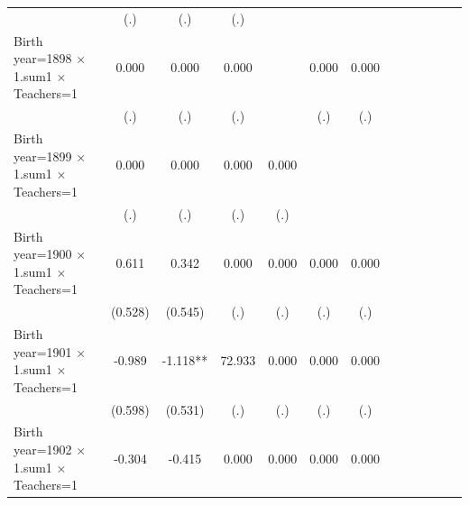 {\begin{tabular}{l*{12}{c}}
                    &         (.)   &         (.)   &         (.)   &               &               &               &               &               &               &               &               &               \\
Birth year=1898 $\times$ 1.sum1 $\times$ Teachers=1&       0.000   &       0.000   &       0.000   &               &       0.000   &       0.000   &               &               &               &               &               &               \\
                    &         (.)   &         (.)   &         (.)   &               &         (.)   &         (.)   &               &               &               &               &               &               \\
Birth year=1899 $\times$ 1.sum1 $\times$ Teachers=1&       0.000   &       0.000   &       0.000   &       0.000   &               &               &               &               &               &               &               &               \\
                    &         (.)   &         (.)   &         (.)   &         (.)   &               &               &               &               &               &               &               &               \\
Birth year=1900 $\times$ 1.sum1 $\times$ Teachers=1&       0.611   &       0.342   &       0.000   &       0.000   &       0.000   &       0.000   &               &               &               &               &               &               \\
                    &     (0.528)   &     (0.545)   &         (.)   &         (.)   &         (.)   &         (.)   &               &               &               &               &               &               \\
Birth year=1901 $\times$ 1.sum1 $\times$ Teachers=1&      -0.989   &      -1.118** &      72.933   &       0.000   &       0.000   &       0.000   &               &               &               &               &               &               \\
                    &     (0.598)   &     (0.531)   &         (.)   &         (.)   &         (.)   &         (.)   &               &               &               &               &               &               \\
Birth year=1902 $\times$ 1.sum1 $\times$ Teachers=1&      -0.304   &      -0.415   &       0.000   &       0.000   &       0.000   &       0.000   &               &               &               &               &               &               \\

\end{tabular}}
